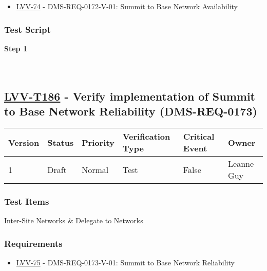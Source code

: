 \begin{itemize}
\tightlist
\item
  \href{https://jira.lsstcorp.org/browse/LVV-74}{LVV-74} -
  DMS-REQ-0172-V-01: Summit to Base Network Availability
\end{itemize}

\hypertarget{test-script-85}{%
\subsubsection{Test Script}\label{test-script-85}}

\textbf{Step 1}\\
~\\
~\\

\hypertarget{lvv-t186---verify-implementation-of-summit-to-base-network-reliability-dms-req-0173}{%
\subsection{\texorpdfstring{\href{https://jira.lsstcorp.org/secure/Tests.jspa\#/testCase/LVV-T186}{LVV-T186}
- Verify implementation of Summit to Base Network Reliability
(DMS-REQ-0173)}{LVV-T186 - Verify implementation of Summit to Base Network Reliability (DMS-REQ-0173)}}\label{lvv-t186---verify-implementation-of-summit-to-base-network-reliability-dms-req-0173}}

\begin{longtable}[]{@{}llllll@{}}
\toprule
Version & Status & Priority & Verification Type & Critical Event &
Owner\tabularnewline
\midrule
\endhead
1 & Draft & Normal & Test & False & Leanne Guy\tabularnewline
\bottomrule
\end{longtable}

\hypertarget{test-items-86}{%
\subsubsection{Test Items}\label{test-items-86}}

Inter-Site Networks \& Delegate to Networks

\hypertarget{requirements-86}{%
\subsubsection{Requirements}\label{requirements-86}}

\begin{itemize}
\tightlist
\item
  \href{https://jira.lsstcorp.org/browse/LVV-75}{LVV-75} -
  DMS-REQ-0173-V-01: Summit to Base Network Reliability
\end{itemize}

